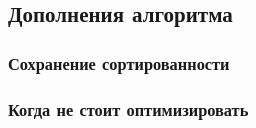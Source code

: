 \subsection{Дополнения алгоритма}

\subsubsection{Сохранение сортированности}

\subsubsection{Когда не стоит оптимизировать}
